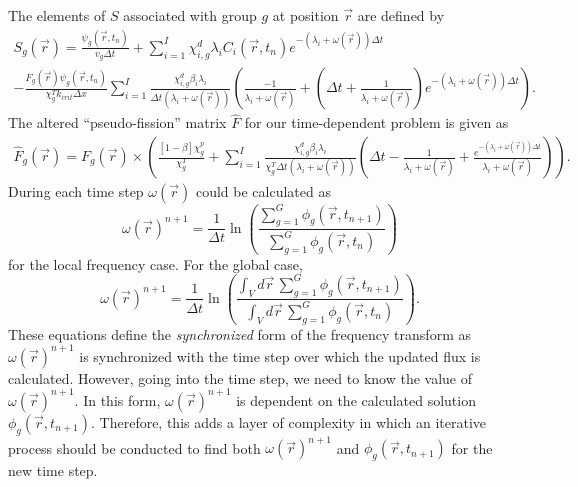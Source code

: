 \documentclass[12pt]{report}
\begin{document}
	The elements of $S$ associated with group $g$ at position $\vec{r}$ are defined by
	\begin{eqnarray}
	S_g(\vec{r}) = 	\frac{\psi_g(\vec{r},t_{n})}{v_g \Delta t} +  \sum_{i=1}^{I} \chi_{i,g}^d \lambda_i C_i(\vec{r},t_{n}) e^{-\left(\lambda_i + \omega(\vec{r})\right) \Delta t} \nonumber \\
	-  \frac{F_g(\vec{r}) \psi_g(\vec{r},t_{n})}{\chi_g^T k_{crit} \Delta x} \sum_{i=1}^{I} \frac{\chi_{i,g}^d \beta_i \lambda_i}{\Delta t \left( \lambda_i + \omega(\vec{r}) \right)} \left( \frac{-1}{\lambda_i + \omega(\vec{r})} + \left(\Delta t + \frac{1}{\lambda_i + \omega(\vec{r})} \right)e^{-\left(\lambda_i + \omega(\vec{r}) \right) \Delta t} \right).
	\end{eqnarray}
    The altered ``pseudo-fission'' matrix $\hat{F}$ for our time-dependent problem is given as
	\begin{eqnarray}
	\hat{F}_g(\vec{r}) = F_g(\vec{r}) \times \left(\frac{\left[ 1- \beta \right] \chi_g^p}{\chi_g^T} + \sum_{i=1}^{I} \frac{\chi_{i,g}^d \beta_i \lambda_i}{\chi_g^T \Delta t \left( \lambda_i + \omega(\vec{r}) \right)} \left( \Delta t - \frac{1}{\lambda_i + \omega(\vec{r})} + \frac{e^{-\left( \lambda_i + \omega(\vec{r}) \right) \Delta t}}{\lambda_i + \omega(\vec{r})}\right) \right) \nonumber.
	\end{eqnarray}
	During each time step $\omega(\vec{r})$ could be calculated as
	\begin{equation}
	\omega(\vec{r})^{n+1} = \frac{1}{\Delta t} \ln \left(\frac{\sum_{g=1}^{G} \phi_g(\vec{r}, t_{n+1})}{\sum_{g=1}^{G} \phi_g(\vec{r}, t_{n})} \right)
	\end{equation}
	for the local frequency case. For the global case,
	\begin{equation}
	\omega(\vec{r})^{n+1} = \frac{1}{\Delta t} \ln \left(\frac{\int_{V} d\vec{r} \, \sum_{g=1}^{G} \phi_g(\vec{r}, t_{n+1})}{\int_{V} d\vec{r} \,\sum_{g=1}^{G} \phi_g(\vec{r}, t_{n})} \right).
	\end{equation}	
	These equations define the \textit{synchronized} form of the frequency transform as $\omega(\vec{r})^{n+1}$ is synchronized with the time step over which the updated flux is calculated. However, going into the time step, we need to know the value of $\omega(\vec{r})^{n+1}$. In this form, $\omega(\vec{r})^{n+1}$ is dependent on the calculated solution $\phi_g(\vec{r}, t_{n+1})$. Therefore, this adds a layer of complexity in which an iterative process should be conducted to find both $\omega(\vec{r})^{n+1}$ and $\phi_g(\vec{r}, t_{n+1})$ for the new time step. 
	
\end{document}
